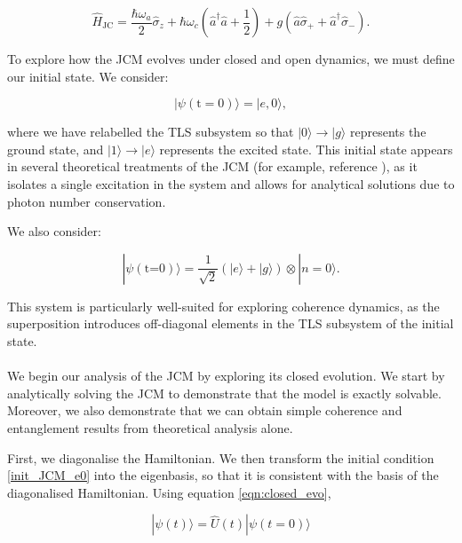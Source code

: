 \documentclass[11pt]{article}
\begin{document}
\begin{equation*}
    \hat{H}_{\scriptscriptstyle \text{JC}} = \frac{\hbar\omega_a}{2}\hat{\sigma}_z + \hbar\omega_c\left(\hat{a}^\dagger \hat{a} + \frac{1}{2} \right) + g(\hat{a}\hat{\sigma}_{+} + \hat{a}^\dagger\hat{\sigma}_{-}). 
\end{equation*} 

To explore how the JCM evolves under closed and open dynamics, we must define our initial state. We consider:

\begin{equation} \label{init_JCM_e0}
    |\psi (\text{t}=0)\rangle = |e, 0\rangle,
\end{equation}

where we have relabelled the TLS subsystem so that $|0\rangle \rightarrow|g\rangle$ represents the ground state, and $|1\rangle \rightarrow |e\rangle$ represents the excited state. This initial state appears in several theoretical treatments of the JCM (for example, reference \cite{Entanglement2009-REE_VNapplied}), as it isolates a single excitation in the system and allows for analytical solutions due to photon number conservation.

We also consider:

\begin{equation} \label{init_JCM_e0g0}
    |\psi (\text{t=0})\rangle = \frac{1}{\sqrt{2}}(|e\rangle + |g\rangle)\otimes|n=0\rangle.
\end{equation}

This system is particularly well-suited for exploring coherence dynamics, as the superposition introduces off-diagonal elements in the TLS subsystem of the initial state.\\
\\
We begin our analysis of the JCM by exploring its closed evolution. We start by analytically solving the JCM to demonstrate that the model is exactly solvable. Moreover, we also demonstrate that we can obtain simple coherence and entanglement results from theoretical analysis alone. 

First, we diagonalise the Hamiltonian. We then transform the initial condition \eqref{init_JCM_e0} into the eigenbasis, so that it is consistent with the basis of the diagonalised Hamiltonian. Using equation \eqref{eqn:closed_evo},

\begin{equation*} 
    |\psi(t)\rangle = \hat{U}(t)|\psi(t=0)\rangle
\end{equation*}
\end{document}
